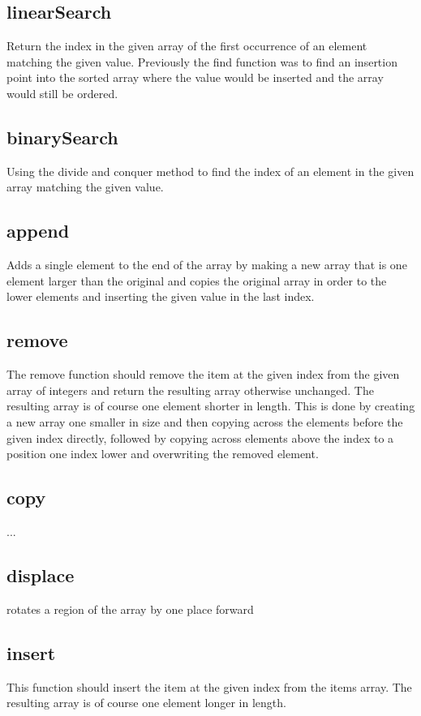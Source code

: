\documentclass[10pt]{article} %
\begin{document}
\subsection{linearSearch}
Return the index in the given array of the first occurrence of an element matching the given value. Previously the find function was to find an insertion point into the sorted array where the value would be inserted and the array would still be ordered. 

\subsection{binarySearch}
Using the divide and conquer method to find the index of an element in the given array matching the given value.

\subsection{append}
Adds a single element to the end of the array by making a new array that is one element larger than the original and copies the original array in order to the lower elements and inserting the given value in the last index.

\subsection{remove}
The remove function should remove the item at the given index from the given array of integers and return the resulting array otherwise unchanged. The resulting array is of course one element shorter in length. This is done by creating a new array one smaller in size and then copying across the elements before the given index directly, followed by copying across elements above the index to a position one index lower and overwriting the removed element.

\subsection{copy}
...

\subsection{displace}
rotates a region of the array by one place forward

\subsection{insert}
This function should insert the item at the given index from the items array.  The resulting array is of course one element longer in length.

\end{document}
